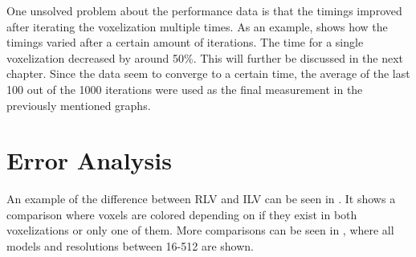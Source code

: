 One unsolved problem about the performance data is that the timings improved after iterating the voxelization multiple times.
As an example,  shows how the timings varied after a certain amount of iterations.
The time for a single voxelization decreased by around 50\%.
This will further be discussed in the next chapter.
Since the data seem to converge to a certain time, the average of the last 100 out of the 1000 iterations were used as the final measurement in the previously mentioned graphs.









\FloatBarrier

\section{Error Analysis}
An example of the difference between RLV and ILV can be seen in . 
It shows a comparison where voxels are colored depending on if they exist in both voxelizations or only one of them.
More comparisons can be seen in , where all models and resolutions between 16-512 are shown. 


